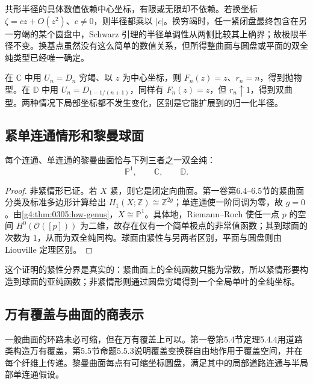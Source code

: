 \ProseParagraphBreak

共形半径的具体数值依赖中心坐标，有限或无限却不依赖。若换坐标 \(\zeta=cz+O(z^2)\)、\(c\ne0\)，则半径都乘以 \(|c|\)。换穷竭时，任一紧闭盘最终包含在另一穷竭的某个圆盘中，Schwarz 引理的半径单调性从两侧比较其上确界；故极限半径不变。换基点虽然没有这么简单的数值关系，但所得整曲面与圆盘或平面的双全纯类型已经唯一确定。

\begin{example}
	\label{g4:exm:0503:radius-models}
	在 \(\mathbb C\) 中用 \(U_n=D_n\) 穷竭、以 \(z\) 为中心坐标，则 \(F_n(z)=z\)、\(r_n=n\)，得到抛物型。在 \(\mathbb D\) 中用 \(U_n=D_{1-1/(n+1)}\)，同样有 \(F_n(z)=z\)，但 \(r_n\uparrow1\)，得到双曲型。两种情况下局部坐标都不发生变化，区别是它能扩展到的归一化半径。
\end{example}

\subsection{紧单连通情形和黎曼球面}
\label{g4:subsec:0503:05}

\begin{theorem}[单连通曲面的统一化]
	\label{g4:thm:0503:uniformization}
	每个连通、单连通的黎曼曲面恰与下列三者之一双全纯：
	\[
		\mathbb P^1,\qquad \mathbb C,\qquad\mathbb D.
	\]
\end{theorem}
\begin{proof}
	非紧情形已证。若 \(X\) 紧，则它是闭定向曲面。第一卷第6.4--6.5节的紧曲面分类及标准多边形计算给出 \(H_1(X;\mathbb Z)\cong\mathbb Z^{2g}\)；单连通使一阶同调为零，故 \(g=0\)。由\cref{g4:thm:0305:low-genus}，\(X\cong\mathbb P^1\)。具体地，Riemann--Roch 使任一点 \(p\) 的空间 \(H^0(\mathcal O([p]))\) 为二维，故存在仅有一个简单极点的非常值函数；其到球面的次数为 \(1\)，从而为双全纯同构。球面由紧性与另两者区别，平面与圆盘则由 Liouville 定理区别。
\end{proof}

这个证明的紧性分界是真实的：紧曲面上的全纯函数只能为常数，所以紧情形要构造到球面的亚纯函数；非紧情形则通过圆盘穷竭得到一个全局单叶的全纯坐标。

\subsection{万有覆盖与曲面的商表示}
\label{g4:subsec:0503:06}

一般曲面的环路未必可缩，但在万有覆盖上可以。第一卷第5.4节定理5.4.4用道路类构造万有覆盖，第5.5节命题5.5.3说明覆盖变换群自由地作用于覆盖空间，并在每个纤维上传递。黎曼曲面每点有可缩坐标圆盘，满足其中的局部道路连通与半局部单连通假设。

